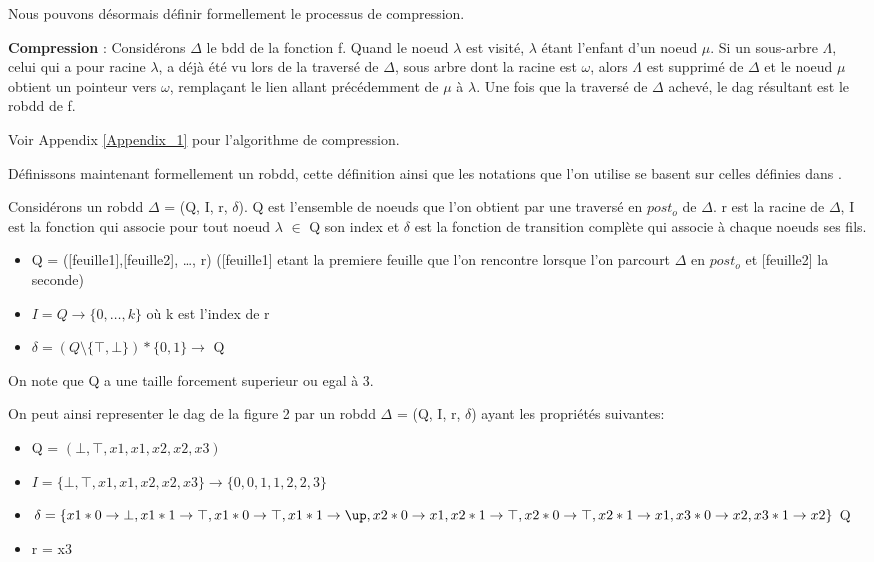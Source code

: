 \documentclass[french]{article}
\begin{document}
Nous pouvons désormais définir formellement le processus de compression.

\textbf{Compression} :  Considérons \(\Delta\) le bdd de la fonction f.  Quand le noeud \(\lambda\) est visité, \(\lambda\) étant l'enfant d'un noeud \(\mu\). Si un sous-arbre \(\Lambda\), celui qui a pour racine \(\lambda\), a déjà été vu lors de la traversé de \(\Delta\), sous arbre dont la racine est \(\omega\), alors \(\Lambda\) est supprimé de \(\Delta\) et le noeud \(\mu\) obtient un pointeur vers \(\omega\), remplaçant le lien allant précédemment de \(\mu\) à \(\lambda\). Une fois que la traversé de \(\Delta\) achevé, le dag résultant est le robdd de f.

Voir Appendix \ref{Appendix_1} pour l'algorithme de compression.
\vspace{5mm} 

Définissons maintenant formellement un robdd, cette définition ainsi que les notations que l'on utilise se basent sur celles définies dans \cite{genitrini}.

Considérons un robdd \(\Delta\) = (Q, I, r, \(\delta\)). Q est l'ensemble de noeuds que l'on obtient par une traversé en \(post_{o}\) de \(\Delta\). r est la racine de \(\Delta\), I est la fonction qui associe pour tout noeud \(\lambda\) \(\in\) Q son index et \(\delta\) est la fonction de transition complète qui associe à chaque noeuds ses fils.
\begin{itemize}
    \item
    	Q  =   ([feuille1],[feuille2], …, r)
    	([feuille1] etant la premiere feuille que l'on rencontre lorsque l'on parcourt \(\Delta\) en \(post_{o}\) et [feuille2] la seconde)
    \item 
        \(I = Q   \rightarrow  \{0, \ldots , k\}\) où k est l'index de r
    \item 
       \( \delta = (Q \setminus  \{\top,  \bot\}) * \{0, 1\} \rightarrow \) Q
\end{itemize}

On note que Q a une taille forcement superieur ou egal à 3.

On peut ainsi representer le dag de la figure 2 par un robdd \(\Delta\) = (Q, I, r, \(\delta\)) ayant les propriétés suivantes:
\begin{itemize}
    \item
    	Q  =   \((\bot, \top, x1,x1,x2,x2,x3)\)
    \item 
        \(I = \{\bot, \top, x1,x1,x2,x2,x3\}   \rightarrow  \{0,0,1,1,2,2,3\}\)
    \item 
       \( \delta = \{ x1 * 0 \rightarrow \bot , x1 * 1 \rightarrow \top, x1 * 0 \rightarrow \top , x1 * 1 \rightarrow \up, x2 * 0 \rightarrow x1, x2 * 1 \rightarrow \top, x2 * 0 \rightarrow \top, x2 * 1 \rightarrow x1, x3 * 0 \rightarrow x2, x3 * 1 \rightarrow x2 \} \) Q
    \item 
        r = x3
\end{itemize}
\end{document}
